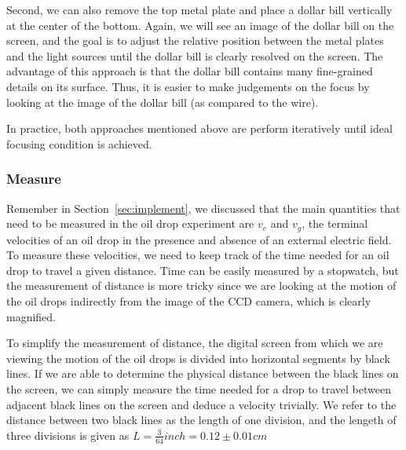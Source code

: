 \documentclass{article}
\begin{document}
Second, we can also remove the top metal plate and place a dollar bill vertically at the center of the bottom. Again, we will see an image of the dollar bill on the screen, and the goal is to adjust the relative position between the metal plates and the light sources until the dollar bill is clearly resolved on the screen. The advantage of this approach is that the dollar bill contains many fine-grained details on its surface. Thus, it is easier to make judgements on the focus by looking at the image of the dollar bill (as compared to the wire). 

In practice, both approaches mentioned above are perform iteratively until ideal focusing condition is achieved.

\subsubsection{Measure}
Remember in Section~\ref{sec:implement}, we discussed that the main quantities that need to be measured in the oil drop experiment are $v_e$ and $v_g$, the terminal velocities of an oil drop in the presence and absence of an external electric field. To measure these velocities, we need to keep track of the time needed for an oil drop to travel a given distance. Time can be easily measured by a stopwatch, but the measurement of distance is more tricky since we are looking at the motion of the oil drops indirectly from the image of the CCD camera, which is clearly magnified. 

To simplify the measurement of distance, the digital screen from which we are viewing the motion of the oil drops is divided into horizontal segments by black lines. If we are able to determine the physical distance between the black lines on the screen, we can simply measure the time needed for a drop to travel between adjacent black lines on the screen and deduce a velocity trivially. We refer to the distance between two black lines as the length of one division, and the lengeth of three divisions is given as $L = \frac{3}{64} inch = 0.12 \pm 0.01 cm$
\end{document}
